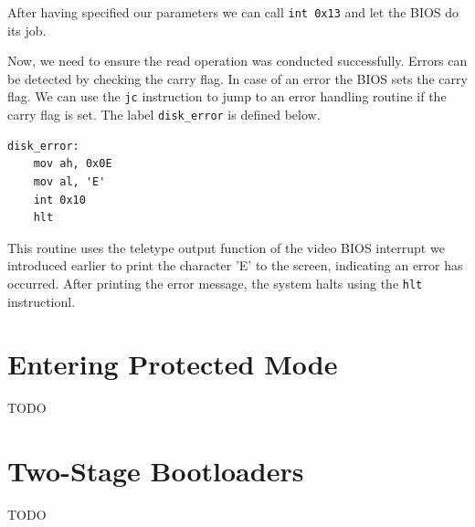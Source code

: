 After having specified our parameters we can call \texttt{int 0x13} and let the BIOS do its job.

Now, we need to ensure the read operation was conducted successfully. Errors can be detected by checking 
the carry flag. In case of an error the BIOS sets the carry flag. We can use the \texttt{jc} instruction 
to jump to an error handling routine if the carry flag is set. The label \texttt{disk\_error} is defined below.

\begin{lstlisting}[caption={Assembly to handle disk read errors}]
disk_error:
    mov ah, 0x0E
    mov al, 'E'
    int 0x10
    hlt
\end{lstlisting}

This routine uses the teletype output function of the video BIOS interrupt we introduced earlier
to print the character 'E' to the screen, indicating an error has occurred. After printing the error message,
the system halts using the \texttt{hlt} instructionl.

\section{Entering Protected Mode}

TODO

\section{Two-Stage Bootloaders}

TODO

